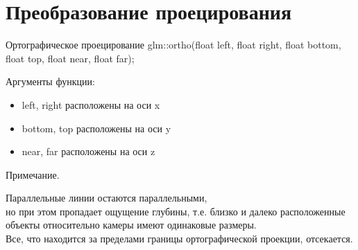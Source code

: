 \documentclass{beamer}
\begin{document}
	\section{Преобразование проецирования}

	\begin{frame}{Ортографическое проецирование}
		glm::ortho(float left, float right, float bottom, float top, float near, float far);
		
		Аргументы функции:
		\begin{itemize}
			\item 
			left, right расположены на оси x
			\item 
			bottom, top расположены на оси y
			\item 
			near, far расположены на оси z
		\end{itemize}

		Примечание.

		Параллельные линии остаются параллельными,
		\\ но при этом пропадает ощущение глубины, т.е. близко и далеко расположенные объекты относительно камеры имеют одинаковые размеры.
		\\ Все, что находится за пределами границы ортографической проекции, отсекается.


	\end{frame}
	
\end{document}
